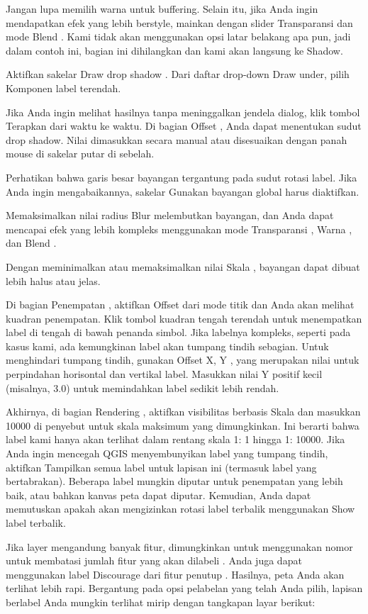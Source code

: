 \documentclass[]{book}
\begin{document}
Jangan lupa memilih warna untuk buffering. Selain itu, jika Anda ingin mendapatkan efek yang lebih berstyle, mainkan dengan slider Transparansi dan mode Blend . Kami tidak akan menggunakan opsi latar belakang apa pun, jadi dalam contoh ini, bagian ini dihilangkan dan kami akan langsung ke Shadow.

Aktifkan sakelar Draw drop shadow . Dari daftar drop-down Draw under, pilih Komponen label terendah.

Jika Anda ingin melihat hasilnya tanpa meninggalkan jendela dialog, klik tombol Terapkan dari waktu ke waktu.
Di bagian Offset , Anda dapat menentukan sudut drop shadow. Nilai dimasukkan secara manual atau disesuaikan dengan panah mouse di sakelar putar di sebelah.

Perhatikan bahwa garis besar bayangan tergantung pada sudut rotasi label. Jika Anda ingin mengabaikannya, sakelar Gunakan bayangan global harus diaktifkan.

Memaksimalkan nilai radius Blur melembutkan bayangan, dan Anda dapat mencapai efek yang lebih kompleks menggunakan mode Transparansi , Warna , dan Blend .

Dengan meminimalkan atau memaksimalkan nilai Skala , bayangan dapat dibuat lebih halus atau jelas.

Di bagian Penempatan , aktifkan Offset dari mode titik dan Anda akan melihat kuadran penempatan. Klik tombol kuadran tengah terendah untuk menempatkan label di tengah di bawah penanda simbol. Jika labelnya kompleks, seperti pada kasus kami, ada kemungkinan label akan tumpang tindih sebagian. Untuk menghindari tumpang tindih, gunakan Offset X, Y , yang merupakan nilai untuk perpindahan horisontal dan vertikal label. Masukkan nilai Y positif kecil (misalnya, 3.0) untuk memindahkan label sedikit lebih rendah.

Akhirnya, di bagian Rendering , aktifkan visibilitas berbasis Skala dan masukkan 10000 di penyebut untuk skala maksimum yang dimungkinkan. Ini berarti bahwa label kami hanya akan terlihat dalam rentang skala 1: 1 hingga 1: 10000. Jika Anda ingin mencegah QGIS menyembunyikan label yang tumpang tindih, aktifkan Tampilkan semua label untuk lapisan ini (termasuk label yang bertabrakan). Beberapa label mungkin diputar untuk penempatan yang lebih baik, atau bahkan kanvas peta dapat diputar. Kemudian, Anda dapat memutuskan apakah akan mengizinkan rotasi label terbalik menggunakan Show label terbalik.

Jika layer mengandung banyak fitur, dimungkinkan untuk menggunakan nomor untuk membatasi jumlah fitur yang akan dilabeli . Anda juga dapat menggunakan label Discourage dari fitur penutup . Hasilnya, peta Anda akan terlihat lebih rapi. Bergantung pada opsi pelabelan yang telah Anda pilih, lapisan berlabel Anda mungkin terlihat mirip dengan tangkapan layar berikut:
\end{document}
